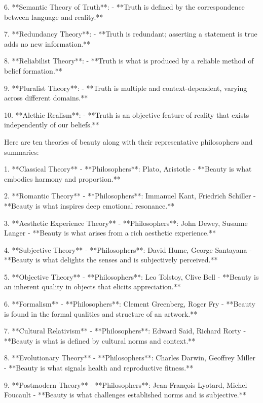 6. **Semantic Theory of Truth**:  
   - **Truth is defined by the correspondence between language and reality.**

7. **Redundancy Theory**:  
   - **Truth is redundant; asserting a statement is true adds no new information.**

8. **Reliabilist Theory**:  
   - **Truth is what is produced by a reliable method of belief formation.**

9. **Pluralist Theory**:  
   - **Truth is multiple and context-dependent, varying across different domains.**

10. **Alethic Realism**:  
    - **Truth is an objective feature of reality that exists independently of our beliefs.**




Here are ten theories of beauty along with their representative philosophers and summaries:

1. **Classical Theory**  
   - **Philosophers**: Plato, Aristotle  
   - **Beauty is what embodies harmony and proportion.**

2. **Romantic Theory**  
   - **Philosophers**: Immanuel Kant, Friedrich Schiller  
   - **Beauty is what inspires deep emotional resonance.**

3. **Aesthetic Experience Theory**  
   - **Philosophers**: John Dewey, Susanne Langer  
   - **Beauty is what arises from a rich aesthetic experience.**

4. **Subjective Theory**  
   - **Philosophers**: David Hume, George Santayana  
   - **Beauty is what delights the senses and is subjectively perceived.**

5. **Objective Theory**  
   - **Philosophers**: Leo Tolstoy, Clive Bell  
   - **Beauty is an inherent quality in objects that elicits appreciation.**

6. **Formalism**  
   - **Philosophers**: Clement Greenberg, Roger Fry  
   - **Beauty is found in the formal qualities and structure of an artwork.**

7. **Cultural Relativism**  
   - **Philosophers**: Edward Said, Richard Rorty  
   - **Beauty is what is defined by cultural norms and context.**

8. **Evolutionary Theory**  
   - **Philosophers**: Charles Darwin, Geoffrey Miller  
   - **Beauty is what signals health and reproductive fitness.**

9. **Postmodern Theory**  
   - **Philosophers**: Jean-François Lyotard, Michel Foucault  
   - **Beauty is what challenges established norms and is subjective.**

